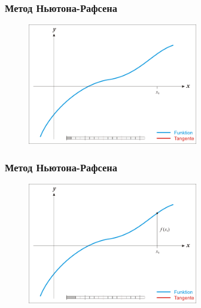 \documentclass[12pt]{beamer}
\begin{document}
\begin{frame}\frametitle{Метод Ньютона-Рафсена}
\begin{figure}[htbp]
  \includegraphics[height=150pt, keepaspectratio = true]{images/newton-1}   
\end{figure}
\end{frame}

\begin{frame}\frametitle{Метод Ньютона-Рафсена}
\begin{figure}[htbp]
  \includegraphics[height=150pt, keepaspectratio = true]{images/newton-2}   
\end{figure}
\end{frame}
\end{document}
